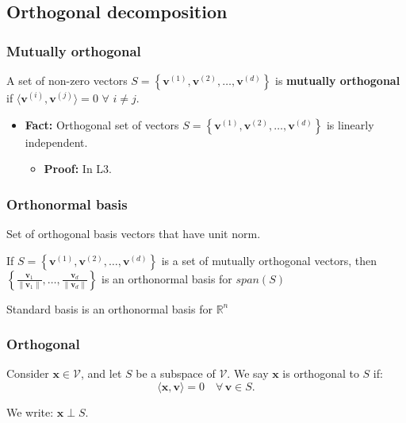 \subsection{Orthogonal decomposition}
\subsubsection{Mutually orthogonal}
\begin{definition}
    A set of non-zero vectors \( S = \left\{ \mathbf{v}^{(1)}, \mathbf{v}^{(2)}, \ldots, \mathbf{v}^{(d)} \right\} \) is \textbf{mutually orthogonal} if \( \langle \mathbf{v}^{(i)}, \mathbf{v}^{(j)} \rangle = 0 \) $\forall$ \( i \neq j \).
    \begin{itemize}
        \item \textbf{Fact:} Orthogonal set of vectors \( S = \left\{ \mathbf{v}^{(1)}, \mathbf{v}^{(2)}, \ldots, \mathbf{v}^{(d)} \right\} \) is linearly independent.
        \begin{itemize}
            \item \textbf{Proof:} In L3.
        \end{itemize}
    \end{itemize}
\end{definition}

\subsubsection{Orthonormal basis}
\begin{definition}
    Set of orthogonal basis vectors that have unit norm.
    \vspace{1em}

    If \( S = \left\{ \mathbf{v}^{(1)}, \mathbf{v}^{(2)}, \ldots, \mathbf{v}^{(d)} \right\} \) is a set of mutually orthogonal vectors, then $\left\{ \frac{\mathbf{v}_{1}}{\|\mathbf{v}_{1}\|}, \ldots, \frac{\mathbf{v}_{d}}{\|\mathbf{v}_{d}\|} \right\}$ is an orthonormal basis for $span(S)$
\end{definition}

\begin{example}
    Standard basis is an orthonormal basis for $\mathbb{R}^n$
\end{example}

\subsubsection{Orthogonal}
\begin{definition}
    Consider \( \mathbf{x} \in \mathcal{V} \), and let \( S \) be a subspace of \( \mathcal{V} \). We say \( \mathbf{x} \) is orthogonal to \( S \) if:
        \[
        \langle \mathbf{x}, \mathbf{v} \rangle = 0 \quad \forall \, \mathbf{v} \in S.
        \]
        
        We write: \( \mathbf{x} \perp S \). 
\end{definition}

